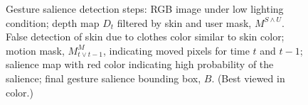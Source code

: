 \documentclass{sigchi}
\begin{document}
\begin{figure}[tb]
\centering
\hspace{-0.6em}%
\caption{Gesture salience detection steps:  RGB image under low lighting condition;
 depth map $D_t$ filtered by skin and user mask, $M^{S\wedge U}$. False detection of skin due to
clothes color similar to skin color;  motion mask,  $M_{t\vee t-1}^M$, indicating moved pixels for time $t$ and $t-1$;
 salience map with red color indicating high probability of the salience; 
 final gesture salience bounding box, $B$. (Best viewed in
color.)}
\label{fig:gesture-salience}
\end{figure}
\end{document}
